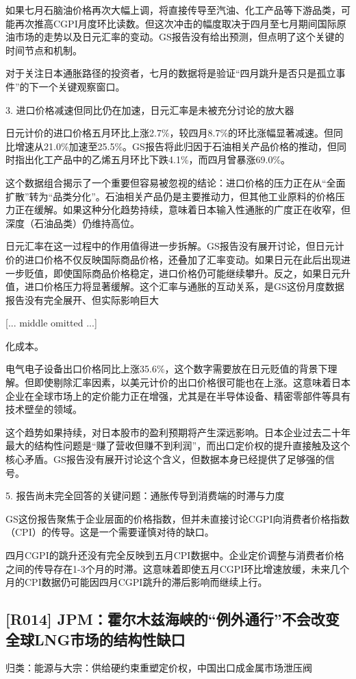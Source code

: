 \documentclass[11pt]{ctexart}
\begin{document}
如果七月石脑油价格再次大幅上调，将直接传导至汽油、化工产品等下游品类，可能再次推高CGPI月度环比读数。但这次冲击的幅度取决于四月至七月期间国际原油市场的走势以及日元汇率的变动。GS报告没有给出预测，但点明了这个关键的时间节点和机制。

对于关注日本通胀路径的投资者，七月的数据将是验证“四月跳升是否只是孤立事件”的下一个关键观察窗口。

3. 进口价格减速但同比仍在加速，日元汇率是未被充分讨论的放大器

日元计价的进口价格五月环比上涨2.7\%，较四月8.7\%的环比涨幅显著减速。但同比增速从21.0\%加速至25.5\%。GS报告将此归因于石油相关产品价格的推动，但同时指出化工产品中的乙烯五月环比下跌4.1\%，而四月曾暴涨69.0\%。

这个数据组合揭示了一个重要但容易被忽视的结论：进口价格的压力正在从“全面扩散”转为“品类分化”。石油相关产品仍是主要推动力，但其他工业原料的价格压力正在缓解。如果这种分化趋势持续，意味着日本输入性通胀的广度正在收窄，但深度（石油品类）仍维持高位。

日元汇率在这一过程中的作用值得进一步拆解。GS报告没有展开讨论，但日元计价的进口价格不仅反映国际商品价格，还叠加了汇率变动。如果日元在此后出现进一步贬值，即使国际商品价格稳定，进口价格仍可能继续攀升。反之，如果日元升值，进口价格压力将显著缓解。这个汇率与通胀的互动关系，是GS这份月度数据报告没有完全展开、但实际影响巨大

[... middle omitted ...]

化成本。

电气电子设备出口价格同比上涨35.6\%，这个数字需要放在日元贬值的背景下理解。但即使剔除汇率因素，以美元计价的出口价格很可能也在上涨。这意味着日本企业在全球市场上的定价能力正在增强，尤其是在半导体设备、精密零部件等具有技术壁垒的领域。

这个趋势如果持续，对日本股市的盈利预期将产生深远影响。日本企业过去二十年最大的结构性问题是“赚了营收但赚不到利润”，而出口定价权的提升直接触及这个核心矛盾。GS报告没有展开讨论这个含义，但数据本身已经提供了足够强的信号。

5. 报告尚未完全回答的关键问题：通胀传导到消费端的时滞与力度

GS这份报告聚焦于企业层面的价格指数，但并未直接讨论CGPI向消费者价格指数（CPI）的传导。这是一个需要谨慎对待的缺口。

四月CGPI的跳升还没有完全反映到五月CPI数据中。企业定价调整与消费者价格之间的传导存在1-3个月的时滞。这意味着即使五月CGPI环比增速放缓，未来几个月的CPI数据仍可能因四月CGPI跳升的滞后影响而继续上行。

\subsection{[R014] JPM：霍尔木兹海峡的“例外通行”不会改变全球LNG市场的结构性缺口}
{\small\color{refgray}归类：能源与大宗：供给硬约束重塑定价权，中国出口成金属市场泄压阀}
\end{document}
